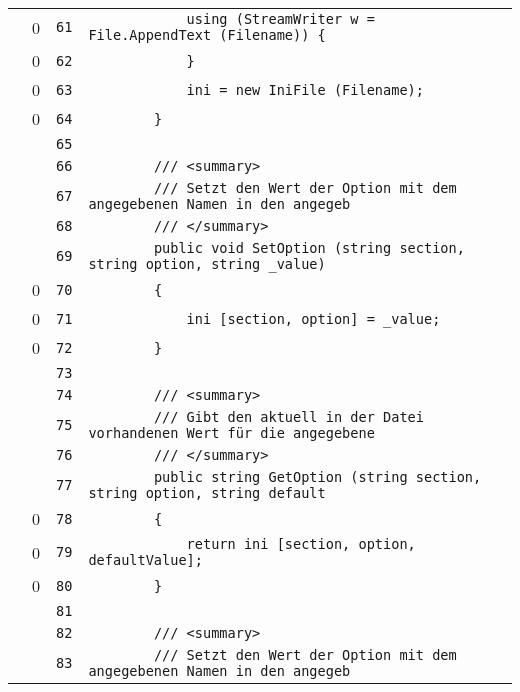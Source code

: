 \documentclass[a4paper,10pt]{article}
\begin{document}
\begin{longtable}[l]{lrrl}
\cellcolor{red} & 0 & \verb~61~ & \verb~            using (StreamWriter w = File.AppendText (Filename)) {~\\
\cellcolor{red} & 0 & \verb~62~ & \verb~            }~\\
\cellcolor{red} & 0 & \verb~63~ & \verb~            ini = new IniFile (Filename);~\\
\cellcolor{red} & 0 & \verb~64~ & \verb~        }~\\
\cellcolor{gray} &  & \verb~65~ & \verb~~\\
\cellcolor{gray} &  & \verb~66~ & \verb~        /// <summary>~\\
\cellcolor{gray} &  & \verb~67~ & \verb~        /// Setzt den Wert der Option mit dem angegebenen Namen in den angegeb~\\
\cellcolor{gray} &  & \verb~68~ & \verb~        /// </summary>~\\
\cellcolor{gray} &  & \verb~69~ & \verb~        public void SetOption (string section, string option, string _value)~\\
\cellcolor{red} & 0 & \verb~70~ & \verb~        {~\\
\cellcolor{red} & 0 & \verb~71~ & \verb~            ini [section, option] = _value;~\\
\cellcolor{red} & 0 & \verb~72~ & \verb~        }~\\
\cellcolor{gray} &  & \verb~73~ & \verb~~\\
\cellcolor{gray} &  & \verb~74~ & \verb~        /// <summary>~\\
\cellcolor{gray} &  & \verb~75~ & \verb~        /// Gibt den aktuell in der Datei vorhandenen Wert für die angegebene ~\\
\cellcolor{gray} &  & \verb~76~ & \verb~        /// </summary>~\\
\cellcolor{gray} &  & \verb~77~ & \verb~        public string GetOption (string section, string option, string default~\\
\cellcolor{red} & 0 & \verb~78~ & \verb~        {~\\
\cellcolor{red} & 0 & \verb~79~ & \verb~            return ini [section, option, defaultValue];~\\
\cellcolor{red} & 0 & \verb~80~ & \verb~        }~\\
\cellcolor{gray} &  & \verb~81~ & \verb~~\\
\cellcolor{gray} &  & \verb~82~ & \verb~        /// <summary>~\\
\cellcolor{gray} &  & \verb~83~ & \verb~        /// Setzt den Wert der Option mit dem angegebenen Namen in den angegeb~\\

\end{longtable}
\end{document}
